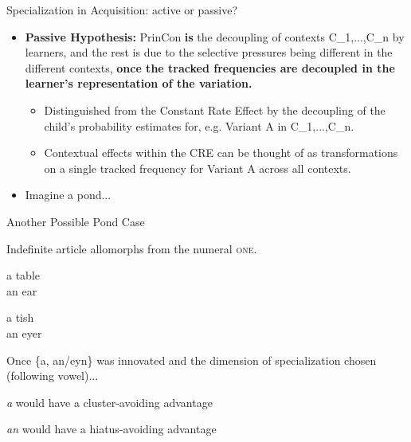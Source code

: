 \documentclass[hyperref={pdfpagelabels=false}]{beamer}
\begin{document}
\begin{frame}{Specialization in Acquisition: active or passive?}
		
		
		\begin{itemize}
			\item[ ] \textbf{Passive Hypothesis:} PrinCon \textbf{is} the decoupling of contexts C_1,...,C_n by learners, and the rest is due to the selective pressures being different in the different contexts, \textbf{once the tracked frequencies are decoupled in the learner's representation of the variation.}
			\begin{itemize} \item Distinguished from the Constant Rate Effect by the decoupling of the child's probability estimates for, e.g. Variant A in C_1,...,C_n.
			\item Contextual effects within the CRE can be thought of as transformations on a single tracked frequency for Variant A across all contexts.\end{itemize}
		\item Imagine a pond...	
		\end{itemize}
\end{frame}


\begin{frame}{Another Possible Pond Case}

\begin{center}
	Indefinite article allomorphs from the numeral \textsc{one}.
\end{center}
	
\begin{exe}
		\ex \begin{xlist} 
			\ex a table\\
			\ex an ear\\
			\end{xlist}
		\ex \begin{xlist} 
			\ex a tish\\
			\ex an eyer\\
			\end{xlist}
\end{exe}

\begin{center}
	\item Once \{a, an/eyn\} was innovated and the dimension of specialization chosen (following vowel)...
		\item \textsl{a} would have a cluster-avoiding advantage
	\item \textsl{an} would have a hiatus-avoiding advantage
\end{center}

\end{frame}
\end{document}
